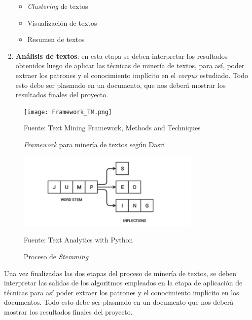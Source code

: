 \begin{enumerate}
\begin{itemize}
            \item \textit{Clustering} de textos
            \item Visualización de textos
            \item Resumen de textos
        \end{itemize}
    \item \textbf{Análisis de textos}: en esta etapa se deben interpretar los resultados obtenidos luego de aplicar las técnicas de minería de textos, para así, poder extraer los patrones y el conocimiento implícito en el \textit{corpus} estudiado. Todo esto debe ser plasmado en un documento, que nos deberá mostrar los resultados finales del proyecto.
    \end{enumerate}
\begin{figure}[H]
    \centering
    \texttt{[image: Framework\_TM.png]}
    \caption{\label{fig:Framework_TM} \textit{Framework} para minería de textos según Dasri} Fuente: Text Mining Framework, Methods and Techniques \cite{dasritext}
\end{figure}

\begin{figure}[H]
    \centering
    \includegraphics[width=0.8\textwidth]{figures/Stemming.png}
    \caption{\label{fig:Stemming} Proceso de \textit{Stemming}} Fuente: Text Analytics with Python \cite{sarkar2016text}
\end{figure}

    Una vez finalizadas las dos etapas del proceso de minería de textos, se deben interpretar las salidas de los algoritmos empleados en la etapa de aplicación de técnicas para así poder extraer los patrones y el conocimiento implícito en los documentos. Todo esto debe ser plasmado en un documento que nos deberá mostrar los resultados finales del proyecto.
    
